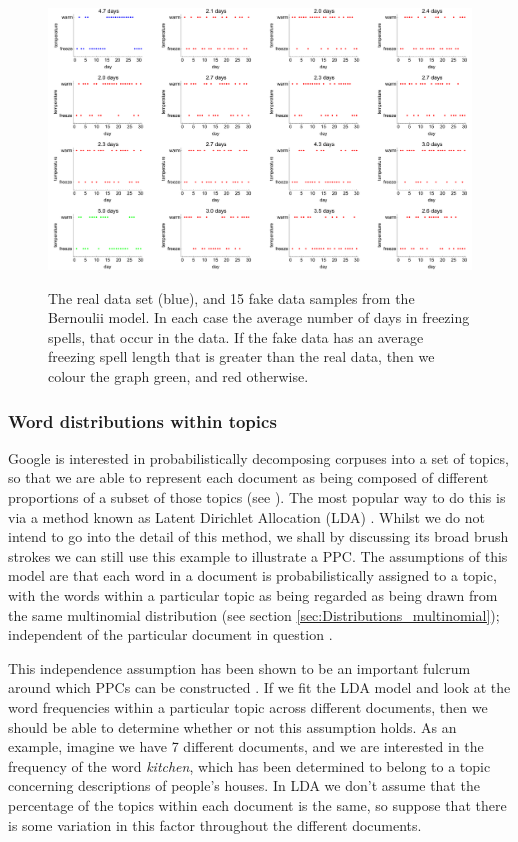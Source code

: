 \documentclass[11pt,fullpage]{book}
\begin{document}
\begin{figure}
\centering
\scalebox{0.25} 
{\includegraphics{Evaluation_snowDays.pdf}}
\caption{The real data set (blue), and 15 fake data samples from the Bernoulii model. In each case the average number of days in freezing spells, that occur in the data. If the fake data has an average freezing spell length that is greater than the real data, then we colour the graph green, and red otherwise.}\label{fig:Evaluation_snowDays}
\end{figure}

\subsubsection{Word distributions within topics}
Google is interested in probabilistically decomposing corpuses into a set of topics, so that we are able to represent each document as being composed of different proportions of a subset of those topics (see \cite{mimno2011bayesian}). The most popular way to do this is via a method known as Latent Dirichlet Allocation (LDA) \cite{blei2003latent}. Whilst we do not intend to go into the detail of this method, we shall by discussing its broad brush strokes we can still use this example to illustrate a PPC. The assumptions of this model are that each word in a document is probabilistically assigned to a topic, with the words within a particular topic as being regarded as being drawn from the same multinomial distribution (see section \ref{sec:Distributions_multinomial}); independent of the particular document in question \cite{blei2003latent}. 

This independence assumption has been shown to be an important fulcrum around which PPCs can be constructed \cite{mimno2011bayesian}. If we fit the LDA model and look at the word frequencies within a particular topic across different documents, then we should be able to determine whether or not this assumption holds. As an example, imagine we have 7 different documents, and we are interested in the frequency of the word \textit{kitchen}, which has been determined to belong to a topic concerning descriptions of people's houses. In LDA we don't assume that the percentage of the topics within each document is the same, so suppose that there is some variation in this factor throughout the different documents. 
\end{document}
